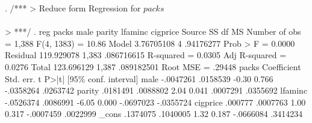 . /***
> Reduce form Regression for $packs$\\\\
> ***/
. reg packs male parity lfaminc cigprice
{\smallskip}
      Source {\VBAR}       SS           df       MS      Number of obs   =     1,388
   F(4, 1383)      =     10.86
       Model {\VBAR}  3.76705108         4   .94176277   Prob > F        =    0.0000
    Residual {\VBAR}  119.929078     1,383  .086716615   R-squared       =    0.0305
   Adj R-squared   =    0.0276
       Total {\VBAR}  123.696129     1,387  .089182501   Root MSE        =    .29448
{\smallskip}
       packs {\VBAR} Coefficient  Std. err.      t    P>|t|     [95\% conf. interval]
        male {\VBAR}  -.0047261   .0158539    -0.30   0.766    -.0358264    .0263742
      parity {\VBAR}   .0181491   .0088802     2.04   0.041     .0007291    .0355692
     lfaminc {\VBAR}  -.0526374   .0086991    -6.05   0.000    -.0697023   -.0355724
    cigprice {\VBAR}    .000777   .0007763     1.00   0.317    -.0007459    .0022999
       _cons {\VBAR}   .1374075   .1040005     1.32   0.187    -.0666084    .3414234
{\smallskip}
